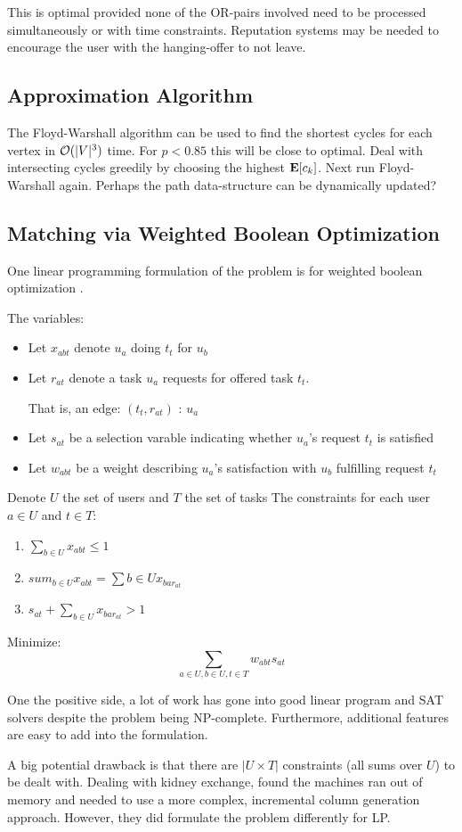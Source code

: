 \documentclass[main.tex]{subfiles}
\begin{document}
This is optimal provided none of the OR-pairs involved need to be processed simultaneously or with time constraints. Reputation systems may be needed to encourage the user with the hanging-offer to not leave.

\subsection{Approximation Algorithm}

The Floyd-Warshall algorithm can be used to find the shortest cycles for each vertex in $\mathcal{O}(|V|^3)$ time. For $p < 0.85$ this will be close to optimal. Deal with intersecting cycles greedily by choosing the highest $\mathbf{E}[c_k]$. Next run Floyd-Warshall again. Perhaps the path data-structure can be dynamically updated?

\subsection{Matching via Weighted Boolean Optimization}

One linear programming formulation of the problem is for weighted boolean optimization \cite{Mar1}.

The variables:
\begin{itemize}
  \item Let $x_{abt}$ denote $u_a$ doing $t_t$ for $u_b$
  \item Let $r_{at}$ denote a task $u_a$ requests for offered task $t_t$.

        That is, an edge: $(t_t, r_{at})$ : $u_a$
  \item Let $s_{at}$ be a selection varable indicating whether $u_a$'s request $t_t$ is satisfied
  \item Let $w_{abt}$ be a weight describing $u_a$'s satisfaction with $u_b$ fulfilling request $t_t$
\end{itemize}

Denote $U$ the set of users and $T$ the set of tasks
The constraints for each user $a \in U$ and $t \in T$:
\begin{enumerate}
  \item $\sum_{b \in U} x_{abt} \leq 1$
  \item $sum_{b \in U} x_{abt} = \sum{b \in U} x_{bar_{at}}$
  \item $s_{at} + \sum_{b \in U} x_{bar_{at}} > 1$
\end{enumerate}

Minimize:
  $$\sum_{a \in U, b \in U, t \in T} w_{abt} s_{at}$$

One the positive side, a lot of work has gone into good linear program and SAT solvers despite the problem being NP-complete. Furthermore, additional features are easy to add into the formulation.

A big potential drawback is that there are $|U \times T|$ constraints (all sums over $U$) to be dealt with. Dealing with kidney exchange, \cite{Abr1} found the machines ran out of memory and needed to use a more complex, incremental column generation approach. However, they did formulate the problem differently for LP.
\end{document}
